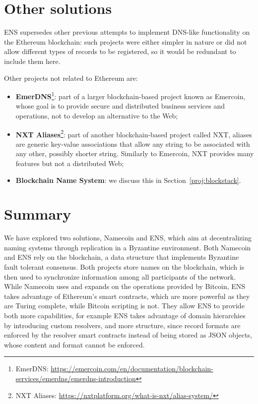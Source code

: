 \documentclass[mscthesis]{usiinfthesis}
\begin{document}
\section{Other solutions}
ENS supersedes other previous attempts to implement DNS-like functionality on the Ethereum blockchain: such projects were either simpler in nature or did not allow different types of records to be registered, %
so it would be redundant to include them here.

Other projects not related to Ethereum are:
\begin{itemize}
	\item \textbf{EmerDNS}\footnote{EmerDNS: \url{https://emercoin.com/en/documentation/blockchain-services/emerdns/emerdns-introduction}}: part of a larger blockchain-based project known as Emercoin, whose goal is to provide secure and distributed business services and operations, not to develop an alternative to the Web;
	\item \textbf{NXT Aliases}\footnote{NXT Aliases: \url{https://nxtplatform.org/what-is-nxt/alias-system/}}: part of another blockchain-based project called NXT, aliases are  generic key-value associations that allow any string to be associated with any other, possibly shorter string. Similarly to Emercoin, NXT provides many features but not a distributed Web;
	\item \textbf{Blockchain Name System}: we discuss this in Section~\ref{proj:blockstack}.
\end{itemize}

\section{Summary}

We have explored two solutions, Namecoin and ENS, which aim at decentralizing naming systems through replication in a Byzantine environment.
Both Namecoin and ENS rely on the blockchain, a data structure that implements Byzantine fault tolerant consensus. Both projects store names on the blockchain, which is then used to synchronize information among all participants of the network. While Namecoin uses and expands on the operations provided by Bitcoin, ENS takes advantage of Ethereum's smart contracts, which are more powerful as they are Turing complete, while Bitcoin scripting is not.
They allow ENS to provide both more capabilities, for example ENS takes advantage of domain hierarchies by introducing custom resolvers, and more structure, since record formats are enforced by the resolver smart contracts instead of being stored as JSON objects, whose content and format cannot be enforced.
\end{document}
